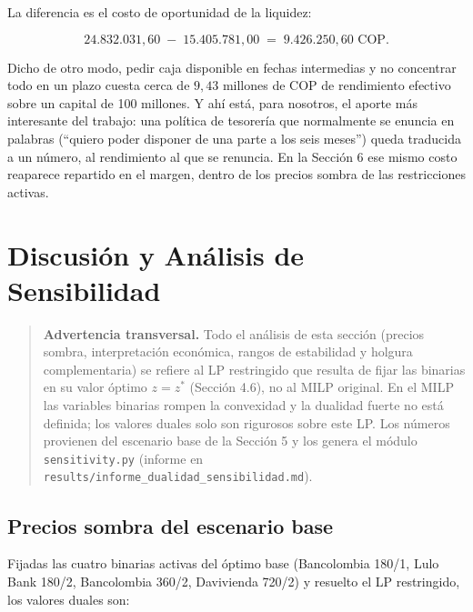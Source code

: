 \documentclass[11pt,a4paper]{article}
\begin{document}
La diferencia es el costo de oportunidad de la liquidez:

\[
24.832.031{,}60 \;-\; 15.405.781{,}00 \;=\; 9.426.250{,}60 \text{ COP} .
\]

Dicho de otro modo, pedir caja disponible en fechas intermedias y no concentrar todo en un
plazo cuesta cerca de $9{,}43$ millones de COP de rendimiento efectivo sobre un capital de 100
millones. Y ahí está, para nosotros, el aporte más interesante del trabajo: una política de
tesorería que normalmente se enuncia en palabras (``quiero poder disponer de una parte a los
seis meses'') queda traducida a un número, al rendimiento al que se renuncia. En la Sección 6
ese mismo costo reaparece repartido en el margen, dentro de los precios sombra de las
restricciones activas.

\section{Discusión y Análisis de Sensibilidad}

\begin{quote}
\textbf{Advertencia transversal.} Todo el análisis de esta sección (precios sombra, interpretación económica, rangos de estabilidad y holgura
complementaria) se refiere al LP restringido que resulta de fijar las
binarias en su valor óptimo $z = z^*$ (Sección 4.6), no al MILP original.
En el MILP las variables binarias rompen la convexidad y la dualidad fuerte no
está definida; los valores duales solo son rigurosos sobre este LP. Los
números provienen del escenario base de la Sección 5 y los genera el módulo
\texttt{sensitivity.py} (informe en \texttt{results/informe\_dualidad\_sensibilidad.md}).
\end{quote}

\subsection{Precios sombra del escenario base}

Fijadas las cuatro binarias activas del óptimo base (Bancolombia 180/1, Lulo
Bank 180/2, Bancolombia 360/2, Davivienda 720/2) y resuelto el LP restringido,
los valores duales son:
\end{document}
